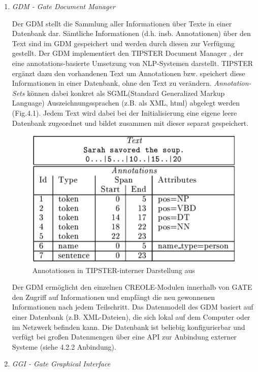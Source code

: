 \documentclass[12pt]{report}
\begin{document}
\begin{enumerate}
\item \textit{GDM - Gate Document Manager}

Der GDM stellt die Sammlung aller Informationen über Texte in einer Datenbank dar. Sämtliche Informationen (d.h. insb. Annotationen) über den Text sind im GDM gespeichert und werden durch diesen zur Verfügung gestellt. Der GDM implementiert den TIPSTER Document Manager \cite{cu97}, der eine annotations-basierte Umsetzung von NLP-Systemen darstellt. TIPSTER ergänzt dazu den vorhandenen Text um Annotationen bzw. speichert diese Informationen in einer Datenbank, ohne den Text zu verändern. \textit{Annotation-Sets} können dabei konkret als SGML(Standard Generalized Markup Language) Auszeichnungssprachen (z.B. als XML, html) abgelegt werden (Fig.4.1). Jedem Text wird dabei bei der Initialisierung eine eigene leere Datenbank zugeordnet und bildet zusammen mit dieser separat gespeichert.

\begin{figure}[h!]
\begin{center}
\includegraphics[scale=0.5]{GATE_Bilder/Tipster.jpg}
\caption{Annotationen in TIPSTER-interner Darstellung aus \cite{cu97}}
\end{center}
\end{figure} 

Der GDM ermöglicht den einzelnen CREOLE-Modulen innerhalb von GATE den Zugriff auf Informationen und empfängt die neu gewonnenen Informationen nach jedem Teilschritt. Das Datenmodell des GDM basiert auf einer Datenbank (z.B. XML-Dateien), die sich lokal auf dem Computer oder im Netzwerk befinden kann. Die Datenbank ist beliebig konfigurierbar und verfügt bei großen Datenmengen über eine API zur Anbindung externer Systeme (siehe 4.2.2 \glqq  Anbindung\grqq{}). 
\item \textit{GGI - Gate Graphical Interface}


\end{enumerate}
\end{document}
